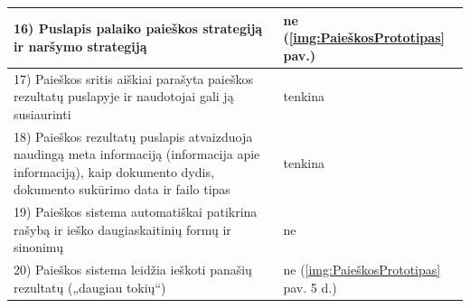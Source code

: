 \documentclass{VUMIFPSkursinis}
\begin{document}
\begin{center}
\begin{tabular}{ |p{13cm}|p{}| }
	16) Puslapis palaiko paieškos strategiją ir naršymo strategiją & ne (\ref{img:PaieškosPrototipas} pav.) \\ \hline
	17) Paieškos sritis aiškiai parašyta paieškos rezultatų puslapyje ir naudotojai gali ją susiaurinti & tenkina \\ \hline
	18) Paieškos rezultatų puslapis atvaizduoja naudingą meta informaciją (informacija apie informaciją), kaip dokumento dydis, dokumento sukūrimo data ir failo tipas & tenkina \\ \hline
	19) Paieškos sistema automatiškai patikrina rašybą ir ieško daugiaskaitinių formų ir sinonimų & ne \\ \hline
	20) Paieškos sistema leidžia ieškoti panašių rezultatų („daugiau tokių“) & ne (\ref{img:PaieškosPrototipas} pav. 5 d.) \\ \hline
\end{tabular}
\label{PaieškosLentelėPrad}
\end{center}
\pagebreak
\end{document}
